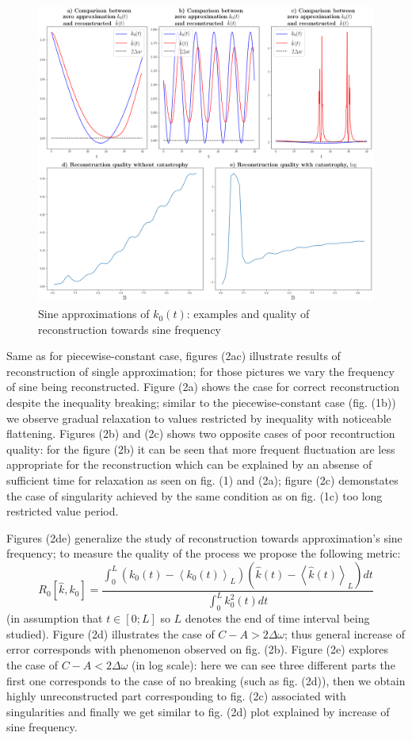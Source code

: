 \documentclass{ws-ijbc}
\begin{document}
\begin{figure}[!h]
\centering{}\includegraphics[width=1\textwidth]{../../../python/pics/v2/sinv2}\caption{Sine approximations of $k_{0}(t)$: examples and quality of reconstruction
towards sine frequency\label{fig:sin}}
\end{figure}

Same as for piecewise-constant case, figures (2a\textendash c) illustrate
results of reconstruction of single approximation; for those pictures
we vary the frequency of sine being reconstructed. Figure (2a) shows
the case for correct reconstruction despite the inequality breaking;
similar to the piecewise-constant case (fig. (1b)) we observe gradual
relaxation to values restricted by inequality with noticeable flattening.
Figures (2b) and (2c) shows two opposite cases of poor recontruction
quality: for the figure (2b) it can be seen that more frequent fluctuation
are less appropriate for the reconstruction which can be explained
by an absense of sufficient time for relaxation as seen on fig. (1)
and (2a); figure (2c) demonstates the case of singularity achieved
by the same condition as on fig. (1c) \textemdash{} too long restricted
value period.

Figures (2d\textendash e) generalize the study of reconstruction towards
approximation's sine frequency; to measure the quality of the process
we propose the following metric:
\[
R_{0}[\hat{k},k_{0}]=\frac{\int_{0}^{L}\left(k_{0}(t)-\left\langle k_{0}(t)\right\rangle _{L}\right)\left(\hat{k}(t)-\left\langle \hat{k}(t)\right\rangle _{L}\right)dt}{\int_{0}^{L}k_{0}^{2}(t)dt}
\]
(in assumption that $t\in[0;L]$ so $L$ denotes the end of time interval
being studied). Figure (2d) illustrates the case of $C-A>2\Delta\omega$;
thus general increase of error corresponds with phenomenon observed
on fig. (2b). Figure (2e) explores the case of $C-A<2\Delta\omega$
(in log scale): here we can see three different parts \textemdash{}
the first one corresponds to the case of no breaking (such as fig.
(2d)), then we obtain highly unreconstructed part corresponding to
fig. (2c) associated with singularities and finally we get similar
to fig. (2d) plot explained by increase of sine frequency.
\end{document}
